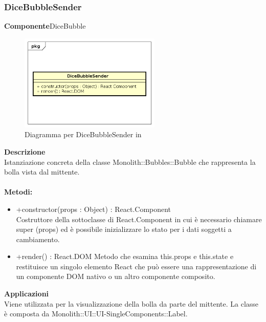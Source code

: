 \subsubsection{DiceBubbleSender}
\textbf{Componente}DiceBubble\\
   \FloatBarrier
   \begin{figure}[ht]
   \centering
   \includegraphics[width=0.6\textwidth]{img/single-DiceBubbleSender}
   \caption{{Diagramma per DiceBubbleSender in }}
\end{figure}
\FloatBarrier
\textbf{Descrizione}\\
Istanziazione concreta della classe Monolith::Bubbles::Bubble che rappresenta la bolla vista dal mittente.
\\
\\
\textbf{Metodi:} 
\begin{itemize}
\item +constructor(props : Object) : React.Component 
\\
Costruttore della sottoclasse di React.Component in cui è necessario chiamare super (props) ed è possibile inizializzare lo stato per i dati soggetti a cambiamento.

\item +render() : React.DOM
Metodo che esamina this.props e this.state e restituisce un singolo elemento React che può essere una rappresentazione di un componente DOM nativo o un altro componente composito.

\end{itemize} 


\textbf{Applicazioni}\\
Viene utilizzata per la visualizzazione della bolla da parte del mittente.
La classe è composta da Monolith::UI::UI-SingleComponents::Label. 


\clearpage

